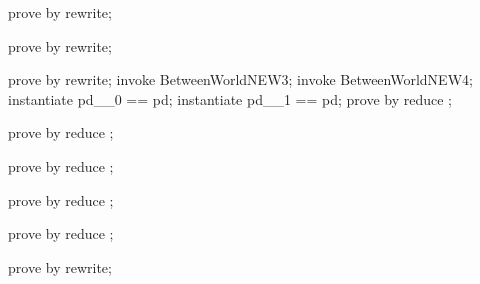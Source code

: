 \begin{LDCheck}\begin{zproof}
   prove by rewrite;
\end{zproof}\end{LDCheck}

\begin{LDCheck}\begin{zproof}
   prove by rewrite;
\end{zproof}\end{LDCheck}

\begin{LDCheck}\begin{zproof}
   prove by rewrite;
   invoke BetweenWorldNEW3;
   invoke BetweenWorldNEW4;
   instantiate pd\_\_0 == pd;
   instantiate pd\_\_1 == pd;
   prove by reduce ;
\end{zproof}\end{LDCheck}

\begin{LDCheck}\begin{zproof}
   prove by reduce ;
\end{zproof}\end{LDCheck}

\begin{LDCheck}\begin{zproof}
   prove by reduce ;
\end{zproof}\end{LDCheck}

\begin{LDCheck}\begin{zproof}
   prove by reduce ;
\end{zproof}\end{LDCheck}

\begin{LDCheck}\begin{zproof}
   prove by reduce ;
\end{zproof}\end{LDCheck}

\begin{LDCheck}\begin{zproof}
   prove by rewrite;
\end{zproof}\end{LDCheck}

